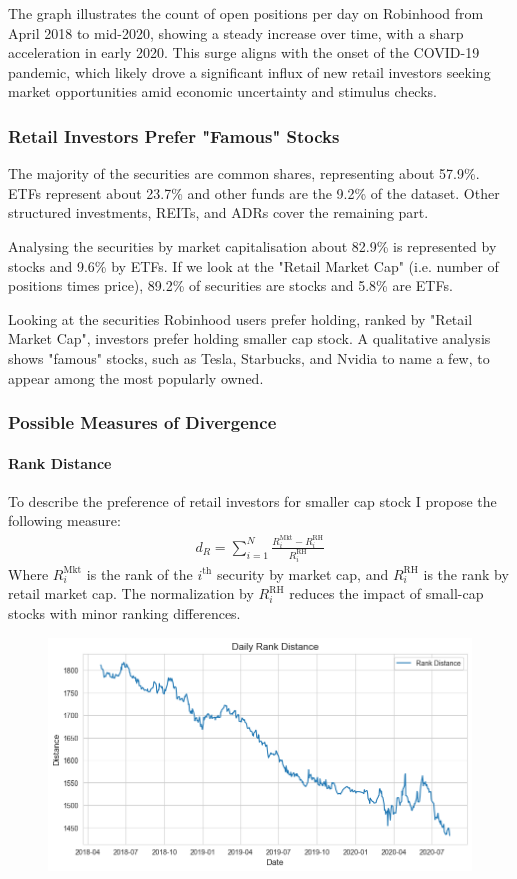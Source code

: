 The graph illustrates the  count of open positions per day  on Robinhood from April 2018 to mid-2020, showing a  steady increase  over time, with a  sharp acceleration in early 2020. This surge aligns with the onset of the  COVID-19 pandemic, which likely drove a significant influx of new retail investors seeking market opportunities amid economic uncertainty and stimulus checks. 



\subsubsection{Retail Investors Prefer "Famous" Stocks}

The majority of the securities are common shares, representing about 57.9\%. ETFs represent about 23.7\% and other funds are the 9.2\% of the dataset. Other structured investments, REITs, and ADRs cover the remaining part.

Analysing the securities by market capitalisation about 82.9\% is represented by stocks and 9.6\% by ETFs. If we look at the "Retail Market Cap" (i.e. number of positions times price), 89.2\% of securities are stocks and 5.8\% are ETFs.  

Looking at the securities Robinhood users prefer holding, ranked by "Retail Market Cap", investors prefer holding smaller cap stock. A qualitative analysis shows "famous" stocks, such as Tesla, Starbucks, and Nvidia to name a few, to appear among the most popularly owned.

\subsubsection{Possible Measures of Divergence} 
\paragraph{Rank Distance} 
To describe the preference of retail investors for smaller cap stock I propose the following measure:
\begin{align*}
    d_R = \sum_{i=1}^N \frac{R^{\text{Mkt}}_i-R^{\text{RH}}_i}{R^{\text{RH}}_i}
\end{align*}
Where $R^{\text{Mkt}}_i$ is the rank of the $i^\text{th}$ security by market cap, and $R^{\text{RH}}_i$ is the rank by retail market cap. The normalization by $R^{\text{RH}}_i$ reduces the impact of small-cap stocks with minor ranking differences.

\begin{figure}[h]
        \centering
        \includegraphics[width=0.8\linewidth]{../images/rank_distance.png}
\end{figure}

